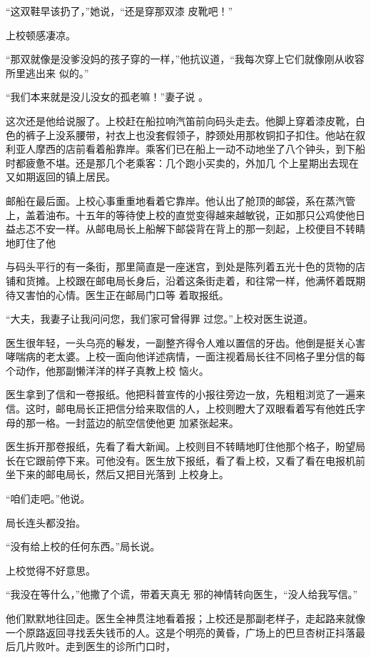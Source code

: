 \documentclass{article}
\begin{document}
“这双鞋早该扔了，”她说，“还是穿那双漆
皮靴吧！” 


上校顿感凄凉。 

\newpage

“那双就像是没爹没妈的孩子穿的一样，”他抗议道，“我每次穿上它们就像刚从收容所里逃出来
似的。” 

“我们本来就是没儿没女的孤老嘛！”妻子说
。 

这次还是他给说服了。上校赶在船拉响汽笛前向码头走去。他脚上穿着漆皮靴，白色的裤子上没系腰带，衬衣上也没套假领子，脖颈处用那枚铜扣子扣住。他站在叙利亚人摩西的店前看着船靠岸。乘客们已在船上一动不动地坐了八个钟头，到下船时都疲惫不堪。还是那几个老乘客：几个跑小买卖的，外加几
个上星期出去现在又如期返回的镇上居民。 

邮船在最后面。上校心事重重地看着它靠岸。他认出了舱顶的邮袋，系在蒸汽管上，盖着油布。十五年的等待使上校的直觉变得越来越敏锐，正如那只公鸡使他日益忐忑不安一样。从邮电局长上船解下邮袋背在背上的那一刻起，上校便目不转睛地盯住了他

\newpage

与码头平行的有一条街，那里简直是一座迷宫，到处是陈列着五光十色的货物的店铺和货摊。上校跟在邮电局长身后，沿着这条街走着，和往常一样，他满怀着既期待又害怕的心情。医生正在邮局门口等
着取报纸。 

“大夫，我妻子让我问问您，我们家可曾得罪
过您。”上校对医生说道。 

医生很年轻，一头乌亮的鬈发，一副整齐得令人难以置信的牙齿。他倒是挺关心害哮喘病的老太婆。上校一面向他详述病情，一面注视着局长往不同格子里分信的每个动作，他那副懒洋洋的样子真教上校
恼火。 

医生拿到了信和一卷报纸。他把科普宣传的小报往旁边一放，先粗粗浏览了一遍来信。这时，邮电局长正把信分给来取信的人，上校则瞪大了双眼看着写有他姓氏字母的那一格。一封蓝边的航空信使他更
加紧张起来。 

\newpage

医生拆开那卷报纸，先看了看大新闻。上校则目不转睛地盯住他那个格子，盼望局长在它跟前停下来。可他没有。医生放下报纸，看了看上校，又看了看在电报机前坐下来的邮电局长，然后又把目光落到
上校身上。 


“咱们走吧。”他说。 


局长连头都没抬。 


“没有给上校的任何东西。”局长说。 


上校觉得不好意思。 

“我没在等什么，”他撒了个谎，带着天真无
邪的神情转向医生，“没人给我写信。” 

他们默默地往回走。医生全神贯注地看着报；上校还是那副老样子，走起路来就像一个原路返回寻找丢失钱币的人。这是个明亮的黄昏，广场上的巴旦杏树正抖落最后几片败叶。走到医生的诊所门口时，
\newpage
\end{document}

